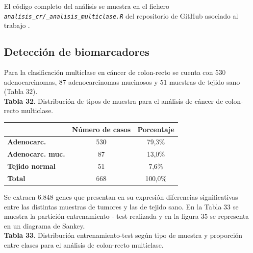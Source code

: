 El código completo del análisis se muestra en el fichero \textit{\texttt{analisis\_cr/\_analisis\_multiclase.R}} del repositorio de GitHub asociado al trabajo \cite{Redondo-Sanchez2020}.

\subsection{Detección de biomarcadores}

Para la clasificación multiclase en cáncer de colon-recto se cuenta con 530 adenocarcinomas, 87 adenocarcinomas mucinosos y 51 muestras de tejido sano (Tabla 32).\\

\textbf{Tabla 32}. Distribución de tipos de muestra para el análisis de cáncer de colon-recto multiclase.

\begin{table}[H]
	\centering
	\begin{tabular}{lcc}
		\cline{2-3}
		& \textbf{Número de casos} & \textbf{Porcentaje} \\ \hline
		\textbf{Adenocarc.}          & 530 & 79,3\%  \\
		\textbf{Adenocarc. muc.} & 87  & 13,0\%  \\
		\textbf{Tejido normal}           & 51  & 7,6\%   \\ \hline
		\textbf{Total}                   & 668 & 100,0\%
	\end{tabular}
\end{table}

Se extraen 6.848 genes que presentan en su expresión diferencias significativas entre las distintas muestras de tumores y las de tejido sano. En la Tabla 33 se muestra la partición entrenamiento - test realizada y en la figura 35 se representa en un diagrama de Sankey.\\

\textbf{Tabla 33}. Distribución entrenamiento-test según tipo de muestra y proporción entre clases para el análisis de colon-recto multiclase.

